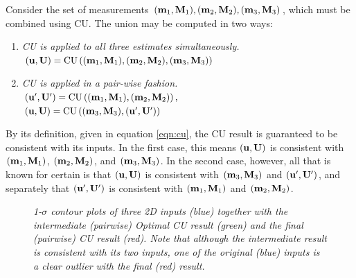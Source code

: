 Consider the set of measurements $(\mathbf{m}_1,\mathbf{M}_1),(\mathbf{m}_2,\mathbf{M}_2),(\mathbf{m}_3,\mathbf{M}_3)$, which must be combined using
CU. The union may be computed in two ways:
\begin{enumerate}
\item {\em CU is applied to all three estimates simultaneously.}\\
    $(\mathbf{u},\mathbf{U})=\operatorname{CU}\left((\mathbf{m}_1,\mathbf{M}_1),(\mathbf{m}_2,\mathbf{M}_2),(\mathbf{m}_3,\mathbf{M}_3)\right)$
\item {\em CU is applied in a pair-wise fashion.}\\
    $(\mathbf{u}',\mathbf{U}')=\operatorname{CU}\left((\mathbf{m}_1,\mathbf{M}_1),(\mathbf{m}_2,\mathbf{M}_2)\right),$\\
    $(\mathbf{u},\mathbf{U})=\operatorname{CU}\left((\mathbf{m}_3,\mathbf{M}_3),(\mathbf{u}',\mathbf{U}')\right)$
\end{enumerate}
By its definition, given in equation \ref{eqn:cu}, the CU result is guaranteed to be consistent with its inputs. In the
first case, this means $(\mathbf{u},\mathbf{U})$ is consistent with $(\mathbf{m}_1,\mathbf{M}_1)$, $(\mathbf{m}_2,\mathbf{M}_2)$, and
$(\mathbf{m}_3,\mathbf{M}_3)$.  In the second case, however, all that is known for certain is that $(\mathbf{u},\mathbf{U})$ is consistent
with $(\mathbf{m}_3,\mathbf{M}_3)$ and $(\mathbf{u}',\mathbf{U}')$, and separately that $(\mathbf{u}',\mathbf{U}')$ is consistent with
$(\mathbf{m}_1,\mathbf{M}_1)$ and $(\mathbf{m}_2,\mathbf{M}_2)$. 
\begin{figure}[tbp]
    \centering
    \caption{\it 1-$\sigma$ contour plots of three 2D inputs (blue) together with the intermediate (pairwise) Optimal CU result
        (green) and the final (pairwise) CU result (red). Note that although the intermediate result is consistent with
        its two inputs, one of the original (blue) inputs is a clear outlier with the final (red) result.}
    \label{fig:cu2d-i}
\end{figure}

